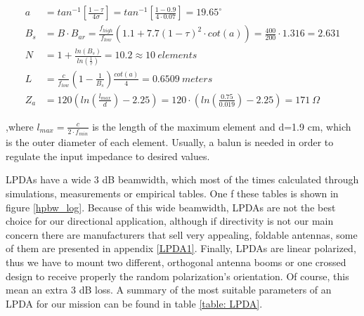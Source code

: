 \begin{subequations}
\begin{align}
    a&=tan^{-1}[\frac{1-\tau}{4 \sigma}]=tan^{-1}[\frac{1-0.9}{4 \cdot 0.07}]=19.65^{\circ} \\
    B_{s}&=B \cdot B_{ar}=\frac{f_{high}}{f_{low}} (1.1+7.7(1-\tau)^2 \cdot cot(a))= \frac{400}{200} \cdot 1.316=2.631 \\
    N&=1+\frac{ln(B_{s})}{ln(\frac{1}{\tau})}=10.2 \approx 10 \ elements \\
    L&=\frac{c}{f_{low}} (1-\frac{1}{B_{s}}) \frac{cot(a)}{4}=0.6509 \ meters \\
    Z_{a}&=120(ln(\frac{l_{max}}{d})-2.25)=120 \cdot (ln(\frac{0.75}{0.019})-2.25)=171 \ \Omega
\end{align}
\label{eq: LPDA}
\end{subequations}

,where $l_{max}=\frac{c}{2 \cdot f_{min}}$ is the length of the maximum element and d=1.9 cm, which is the outer diameter of each element. Usually, a balun is needed in order to regulate the input impedance to desired values. 

LPDAs have a wide 3 dB beamwidth, which most of the times calculated through simulations, measurements or empirical tables. One f these tables is shown in figure \ref{hpbw_log}. Because of this wide beamwidth, LPDAs are not the best choice for our directional application, although if directivity is not our main concern there are manufacturers that sell very appealing, foldable antennas, some of them are presented in appendix \ref{LPDA1}. Finally, LPDAs are linear polarized, thus we have to mount two different, orthogonal antenna booms or one crossed design to receive properly the random polarization's orientation. Of course, this mean an extra 3 dB loss. A summary of the most suitable parameters of an LPDA for our mission can be found in table \ref{table: LPDA}.

